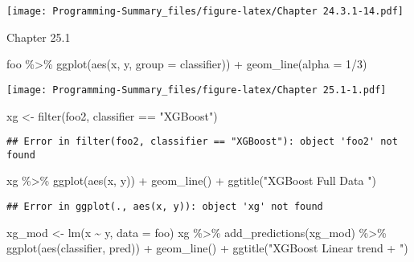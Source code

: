 \documentclass[
]{article}
\newenvironment{Shaded}{\begin{snugshade}}{\end{snugshade}}
\newcommand{\AttributeTok}[1]{\textcolor[rgb]{0.77,0.63,0.00}{#1}}
\newcommand{\DecValTok}[1]{\textcolor[rgb]{0.00,0.00,0.81}{#1}}
\newcommand{\FunctionTok}[1]{\textcolor[rgb]{0.00,0.00,0.00}{#1}}
\newcommand{\NormalTok}[1]{#1}
\newcommand{\OtherTok}[1]{\textcolor[rgb]{0.56,0.35,0.01}{#1}}
\newcommand{\SpecialCharTok}[1]{\textcolor[rgb]{0.00,0.00,0.00}{#1}}
\newcommand{\StringTok}[1]{\textcolor[rgb]{0.31,0.60,0.02}{#1}}
\begin{document}
\texttt{[image: Programming-Summary\_files/figure-latex/Chapter 24.3.1-14.pdf]}

Chapter 25.1

\begin{Shaded}
\begin{Highlighting}[]
\NormalTok{foo }\SpecialCharTok{\%\textgreater{}\%} 
  \FunctionTok{ggplot}\NormalTok{(}\FunctionTok{aes}\NormalTok{(x, y, }\AttributeTok{group =}\NormalTok{ classifier)) }\SpecialCharTok{+}
  \FunctionTok{geom\_line}\NormalTok{(}\AttributeTok{alpha =} \DecValTok{1}\SpecialCharTok{/}\DecValTok{3}\NormalTok{)}
\end{Highlighting}
\end{Shaded}

\texttt{[image: Programming-Summary\_files/figure-latex/Chapter 25.1-1.pdf]}

\begin{Shaded}
\begin{Highlighting}[]
\NormalTok{xg }\OtherTok{\textless{}{-}} \FunctionTok{filter}\NormalTok{(foo2, classifier }\SpecialCharTok{==} \StringTok{"XGBoost"}\NormalTok{)}
\end{Highlighting}
\end{Shaded}

\begin{verbatim}
## Error in filter(foo2, classifier == "XGBoost"): object 'foo2' not found
\end{verbatim}

\begin{Shaded}
\begin{Highlighting}[]
\NormalTok{xg }\SpecialCharTok{\%\textgreater{}\%} 
  \FunctionTok{ggplot}\NormalTok{(}\FunctionTok{aes}\NormalTok{(x, y)) }\SpecialCharTok{+} 
  \FunctionTok{geom\_line}\NormalTok{() }\SpecialCharTok{+} 
  \FunctionTok{ggtitle}\NormalTok{(}\StringTok{"XGBoost Full Data "}\NormalTok{)}
\end{Highlighting}
\end{Shaded}

\begin{verbatim}
## Error in ggplot(., aes(x, y)): object 'xg' not found
\end{verbatim}

\begin{Shaded}
\begin{Highlighting}[]
\NormalTok{xg\_mod }\OtherTok{\textless{}{-}} \FunctionTok{lm}\NormalTok{(x }\SpecialCharTok{\textasciitilde{}}\NormalTok{ y, }\AttributeTok{data =}\NormalTok{ foo)}
\NormalTok{xg }\SpecialCharTok{\%\textgreater{}\%} 
  \FunctionTok{add\_predictions}\NormalTok{(xg\_mod) }\SpecialCharTok{\%\textgreater{}\%}
  \FunctionTok{ggplot}\NormalTok{(}\FunctionTok{aes}\NormalTok{(classifier, pred)) }\SpecialCharTok{+} 
  \FunctionTok{geom\_line}\NormalTok{() }\SpecialCharTok{+} 
  \FunctionTok{ggtitle}\NormalTok{(}\StringTok{"XGBoost Linear trend + "}\NormalTok{)}
\end{Highlighting}
\end{Shaded}
\end{document}
